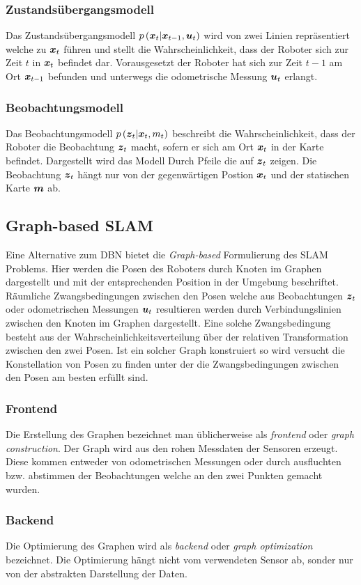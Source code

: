 \documentclass[12pt]{article}
\renewcommand*\vec[1]{{\mbox{\boldmath\ensuremath{#1}}}}
\begin{document}
\subsubsection{Zustandsübergangsmodell}
Das Zustandsübergangsmodell $p\left(\vec x_t |\vec x_{t-1}, \vec u_t\right)$ wird von zwei Linien repräsentiert welche zu $\vec x_t$ führen und
stellt die Wahrscheinlichkeit, dass der Roboter sich zur Zeit $t$ in $\vec x_t$ befindet dar. Vorausgesetzt der Roboter hat sich zur Zeit $t-1$ am
Ort $\vec x_{t-1}$ befunden und unterwegs die odometrische Messung $\vec u_t$ erlangt.

\subsubsection{Beobachtungsmodell}
Das Beobachtungsmodell $p\left(\vec z_t|\vec x_t, m_t\right)$ beschreibt die Wahrscheinlichkeit, dass der Roboter die Beobachtung $\vec z_t$
macht, sofern er sich am Ort $\vec x_t$ in der Karte befindet. Dargestellt wird das Modell Durch Pfeile die auf $\vec z_t$ zeigen. Die Beobachtung
$\vec z_t$ hängt nur von der gegenwärtigen Postion $\vec x_t$ und der statischen Karte $\vec m$ ab.

\subsection{Graph-based SLAM}
Eine Alternative zum DBN bietet die \textit{Graph-based} Formulierung des SLAM Problems. Hier werden die Posen des Roboters durch Knoten im Graphen
dargestellt und mit der entsprechenden Position in der Umgebung beschriftet. Räumliche Zwangsbedingungen zwischen den Posen welche aus Beobachtungen
$\vec z_t$ oder odometrischen Messungen $\vec u_t$ resultieren werden durch Verbindungslinien zwischen den Knoten im Graphen dargestellt. Eine solche
Zwangsbedingung besteht aus der Wahrscheinlichkeitsverteilung über der relativen Transformation zwischen den zwei Posen. Ist ein solcher Graph konstruiert
so wird versucht die Konstellation von Posen zu finden unter der die Zwangsbedingungen zwischen den Posen am besten erfüllt sind.

\subsubsection{Frontend}
Die Erstellung des Graphen bezeichnet man üblicherweise als \textit{frontend} oder \textit{graph construction}. Der Graph wird aus den rohen Messdaten
der Sensoren erzeugt.
Diese kommen entweder von odometrischen Messungen oder durch ausfluchten bzw. abstimmen der Beobachtungen welche an den zwei Punkten gemacht wurden.

\subsubsection{Backend}
Die Optimierung des Graphen wird als \textit{backend} oder \textit{graph optimization} bezeichnet. Die Optimierung hängt nicht vom verwendeten Sensor
ab, sonder nur von der abstrakten Darstellung der Daten.
\end{document}
